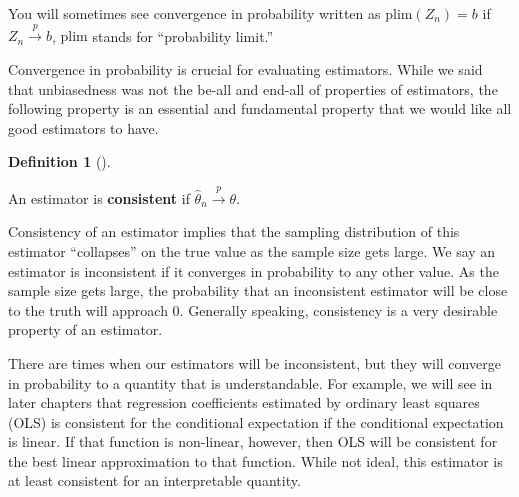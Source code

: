 \documentclass[
  letterpaper,
  DIV=11,
  numbers=noendperiod]{scrreprt}
\newcommand{\inprob}{\overset{p}{\to}}
\theoremstyle{definition}
\theoremstyle{definition}
\newtheorem{definition}{Definition}[chapter]
\theoremstyle{plain}
\theoremstyle{remark}
\begin{document}
\begin{tcolorbox}[enhanced jigsaw, colframe=quarto-callout-note-color-frame, rightrule=.15mm, colback=white, breakable, opacityback=0, coltitle=black, opacitybacktitle=0.6, arc=.35mm, left=2mm, leftrule=.75mm, toptitle=1mm, colbacktitle=quarto-callout-note-color!10!white, titlerule=0mm, title=\textcolor{quarto-callout-note-color}{\faInfo}\hspace{0.5em}{Notation alert}, bottomrule=.15mm, bottomtitle=1mm, toprule=.15mm]

You will sometimes see convergence in probability written as
\(\text{plim}(Z_n) = b\) if \(Z_n \inprob b\), \(\text{plim}\) stands
for ``probability limit.''

\end{tcolorbox}

Convergence in probability is crucial for evaluating estimators. While
we said that unbiasedness was not the be-all and end-all of properties
of estimators, the following property is an essential and fundamental
property that we would like all good estimators to have.

\begin{definition}[]\protect\hypertarget{def-consistency}{}\label{def-consistency}

An estimator is \textbf{consistent} if
\(\widehat{\theta}_n \inprob \theta\).

\end{definition}

Consistency of an estimator implies that the sampling distribution of
this estimator ``collapses'' on the true value as the sample size gets
large. We say an estimator is inconsistent if it converges in
probability to any other value. As the sample size gets large, the
probability that an inconsistent estimator will be close to the truth
will approach 0. Generally speaking, consistency is a very desirable
property of an estimator.

\begin{tcolorbox}[enhanced jigsaw, colframe=quarto-callout-note-color-frame, rightrule=.15mm, colback=white, breakable, opacityback=0, coltitle=black, opacitybacktitle=0.6, arc=.35mm, left=2mm, leftrule=.75mm, toptitle=1mm, colbacktitle=quarto-callout-note-color!10!white, titlerule=0mm, title=\textcolor{quarto-callout-note-color}{\faInfo}\hspace{0.5em}{Note}, bottomrule=.15mm, bottomtitle=1mm, toprule=.15mm]

There are times when our estimators will be inconsistent, but they will
converge in probability to a quantity that is understandable. For
example, we will see in later chapters that regression coefficients
estimated by ordinary least squares (OLS) is consistent for the
conditional expectation if the conditional expectation is linear. If
that function is non-linear, however, then OLS will be consistent for
the best linear approximation to that function. While not ideal, this
estimator is at least consistent for an interpretable quantity.

\end{tcolorbox}
\end{document}
